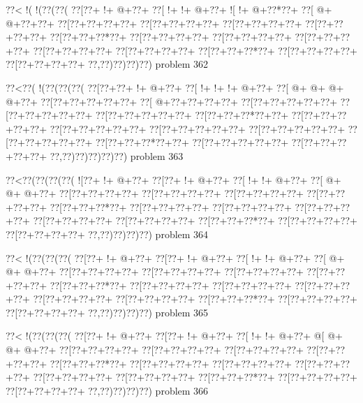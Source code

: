 \vbox{\vbox{\goo
\0??<\- !(\- !(\0??(\0??(
\0??[\0??+\- !+\- @+\0??+
\0??[\- !+\- !+\- @+\0??+
\- ![\- !+\- @+\0??*\0??+
\0??[\- @+\- @+\0??+\0??+
\0??[\0??+\0??+\0??+\0??+
\0??[\0??+\0??+\0??+\0??+
\0??[\0??+\0??+\0??+\0??+
\0??[\0??+\0??+\0??+\0??+
\0??[\0??+\0??+\0??*\0??+
\0??[\0??+\0??+\0??+\0??+
\0??[\0??+\0??+\0??+\0??+
\0??[\0??+\0??+\0??+\0??+
\0??[\0??+\0??+\0??+\0??+
\0??[\0??+\0??+\0??+\0??+
\0??[\0??+\0??+\0??*\0??+
\0??[\0??+\0??+\0??+\0??+
\0??[\0??+\0??+\0??+\0??+
\0??,\0??)\0??)\0??)\0??)
}
\hfil problem 362\hfil\break
}

\vbox{\vbox{\goo
\0??<\0??(\- !(\0??(\0??(\0??(
\0??[\0??+\0??+\- !+\- @+\0??+
\0??[\- !+\- !+\- !+\- @+\0??+
\0??[\- @+\- @+\- @+\- @+\0??+
\0??[\0??+\0??+\0??+\0??+\0??+
\0??[\- @+\0??+\0??+\0??+\0??+
\0??[\0??+\0??+\0??+\0??+\0??+
\0??[\0??+\0??+\0??+\0??+\0??+
\0??[\0??+\0??+\0??+\0??+\0??+
\0??[\0??+\0??+\0??*\0??+\0??+
\0??[\0??+\0??+\0??+\0??+\0??+
\0??[\0??+\0??+\0??+\0??+\0??+
\0??[\0??+\0??+\0??+\0??+\0??+
\0??[\0??+\0??+\0??+\0??+\0??+
\0??[\0??+\0??+\0??+\0??+\0??+
\0??[\0??+\0??+\0??*\0??+\0??+
\0??[\0??+\0??+\0??+\0??+\0??+
\0??[\0??+\0??+\0??+\0??+\0??+
\0??,\0??)\0??)\0??)\0??)\0??)
}
\hfil problem 363\hfil\break
}

\vbox{\vbox{\goo
\0??<\0??(\0??(\0??(\0??(
\- ![\0??+\- !+\- @+\0??+
\0??[\0??+\- !+\- @+\0??+
\0??[\- !+\- !+\- @+\0??+
\0??[\- @+\- @+\- @+\0??+
\0??[\0??+\0??+\0??+\0??+
\0??[\0??+\0??+\0??+\0??+
\0??[\0??+\0??+\0??+\0??+
\0??[\0??+\0??+\0??+\0??+
\0??[\0??+\0??+\0??*\0??+
\0??[\0??+\0??+\0??+\0??+
\0??[\0??+\0??+\0??+\0??+
\0??[\0??+\0??+\0??+\0??+
\0??[\0??+\0??+\0??+\0??+
\0??[\0??+\0??+\0??+\0??+
\0??[\0??+\0??+\0??*\0??+
\0??[\0??+\0??+\0??+\0??+
\0??[\0??+\0??+\0??+\0??+
\0??,\0??)\0??)\0??)\0??)
}
\hfil problem 364\hfil\break
}

\vbox{\vbox{\goo
\0??<\- !(\0??(\0??(\0??(
\0??[\0??+\- !+\- @+\0??+
\0??[\0??+\- !+\- @+\0??+
\0??[\- !+\- !+\- @+\0??+
\0??[\- @+\- @+\- @+\0??+
\0??[\0??+\0??+\0??+\0??+
\0??[\0??+\0??+\0??+\0??+
\0??[\0??+\0??+\0??+\0??+
\0??[\0??+\0??+\0??+\0??+
\0??[\0??+\0??+\0??*\0??+
\0??[\0??+\0??+\0??+\0??+
\0??[\0??+\0??+\0??+\0??+
\0??[\0??+\0??+\0??+\0??+
\0??[\0??+\0??+\0??+\0??+
\0??[\0??+\0??+\0??+\0??+
\0??[\0??+\0??+\0??*\0??+
\0??[\0??+\0??+\0??+\0??+
\0??[\0??+\0??+\0??+\0??+
\0??,\0??)\0??)\0??)\0??)
}
\hfil problem 365\hfil\break
}

\vbox{\vbox{\goo
\0??<\- !(\0??(\0??(\0??(
\0??[\0??+\- !+\- @+\0??+
\0??[\0??+\- !+\- @+\0??+
\0??[\- !+\- !+\- @+\0??+
\- @[\- @+\- @+\- @+\0??+
\0??[\0??+\0??+\0??+\0??+
\0??[\0??+\0??+\0??+\0??+
\0??[\0??+\0??+\0??+\0??+
\0??[\0??+\0??+\0??+\0??+
\0??[\0??+\0??+\0??*\0??+
\0??[\0??+\0??+\0??+\0??+
\0??[\0??+\0??+\0??+\0??+
\0??[\0??+\0??+\0??+\0??+
\0??[\0??+\0??+\0??+\0??+
\0??[\0??+\0??+\0??+\0??+
\0??[\0??+\0??+\0??*\0??+
\0??[\0??+\0??+\0??+\0??+
\0??[\0??+\0??+\0??+\0??+
\0??,\0??)\0??)\0??)\0??)
}
\hfil problem 366\hfil\break
}

